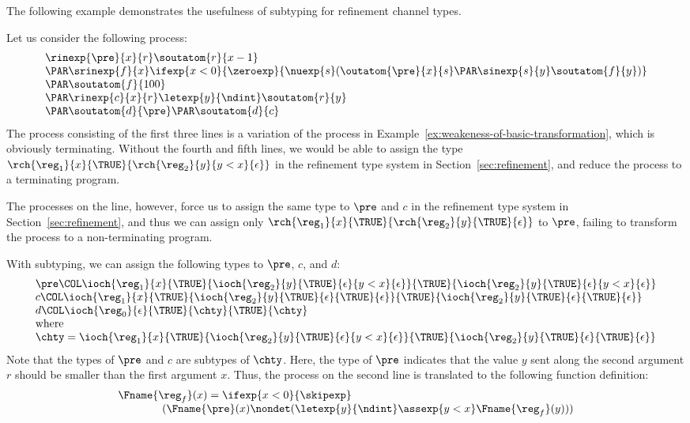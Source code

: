 The following example demonstrates the usefulness of subtyping for refinement channel
types.
\begin{example}
  \label{ex:subtyping}
  Let us consider the following process:
  \[
  \begin{array}{l}
    \rinexp{\pre}{x}{r}\soutatom{r}{x-1}\\
\PAR
\srinexp{f}{x}\ifexp{x<0}{\zeroexp}
        {\nuexp{s}(\outatom{\pre}{x}{s}\PAR \sinexp{s}{y}\soutatom{f}{y})}\\
\PAR \soutatom{f}{100}\\
\PAR \rinexp{c}{x}{r}\letexp{y}{\ndint}\soutatom{r}{y}\\
\PAR \soutatom{d}{\pre}\PAR \soutatom{d}{c}
  \end{array}
  \]
  The process consisting of the first three lines
  is a variation of the process in Example~\ref{ex:weakeness-of-basic-transformation},
  which is obviously terminating.
  Without the fourth and fifth lines, we would be able to assign
  the type \(\rch{\reg_1}{x}{\TRUE}{\rch{\reg_2}{y}{y<x}{\epsilon}}\)
  in the refinement type system in Section~\ref{sec:refinement},
  and reduce the process to a terminating program.

  The processes on the  line, however, force us to assign the same type
  to \(\pre\) and \(c\) in the refinement type system in Section~\ref{sec:refinement},
  and thus we can assign only \(\rch{\reg_1}{x}{\TRUE}{\rch{\reg_2}{y}{\TRUE}{\epsilon}}\)
  to \(\pre\), failing to transform the process to a non-terminating program.

  With subtyping, we can assign the following types to \(\pre\), \(c\), and \(d\):
  \[
  \begin{array}{l}
    \pre\COL
    \ioch{\reg_1}{x}{\TRUE}{\ioch{\reg_2}{y}{\TRUE}{\epsilon}{y<x}{\epsilon}}{\TRUE}{\ioch{\reg_2}{y}{\TRUE}{\epsilon}{y<x}{\epsilon}}\\
    c\COL
    \ioch{\reg_1}{x}{\TRUE}{\ioch{\reg_2}{y}{\TRUE}{\epsilon}{\TRUE}{\epsilon}}{\TRUE}{\ioch{\reg_2}{y}{\TRUE}{\epsilon}{\TRUE}{\epsilon}}\\
    d\COL
    \ioch{\reg_0}{\epsilon}{\TRUE}{\chty}{\TRUE}{\chty}\\
    \mbox{where}\\
    \chty =
    \ioch{\reg_1}{x}{\TRUE}{\ioch{\reg_2}{y}{\TRUE}{\epsilon}{y<x}{\epsilon}}{\TRUE}{\ioch{\reg_2}{y}{\TRUE}{\epsilon}{\TRUE}{\epsilon}}\\
  \end{array}
  \]
  Note that the types of \(\pre\) and \(c\) are
  subtypes of \(\chty\).
  Here, the type of \(\pre\) indicates that
  the value \(y\) sent along the second argument \(r\) should be smaller than
  the first argument \(x\).
  Thus, the process on the second line is translated to the following
  function definition:
  \[
 \begin{array}{l}
\Fname{\reg_f}(x)=\ifexp{x<0}{\skipexp}\\\qquad\qquad{
  (\Fname{\pre}(x)\nondet (\letexp{y}{\ndint}\assexp{y<x}\Fname{\reg_f}(y)))}
\end{array}
\]

\end{example}

